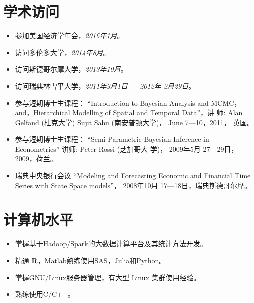 \documentclass[twoside,a4paper,11pt]{article}
\begin{document}
\section*{学术访问}

\begin{itemize}
\item 参加美国经济学年会，\emph{2016年1月}。
\item 访问多伦多大学，\emph{2014年8月}。
\item 访问斯德哥尔摩大学，\emph{2013年10月}。

\item 访问瑞典林雪平大学，\emph{2011年9月1日 --- 2012年 2月29日}。

\item 参与短期博士生课程： ``Introduction to Bayesian Analysis and
  MCMC， and，Hierarchical Modelling of Spatial and Temporal Data''，讲
  师: Alan Gelfand (杜克大学) Sujit Sahu (南安普顿大学)， June
  7---10，2011， 英国。

\item 参与短期博士生课程： ``Semi-Parametric Bayesian Inference in
  Econometrics'' 讲师: Peter Rossi (芝加哥大
  学)， 2009年5月 27---29日，2009，荷兰。

\item 瑞典中央银行会议 ``Modeling and Forecasting Economic and
  Financial Time Series with State Space
  models''， 2008年10月 17---18日，瑞典斯德哥尔摩。
\end{itemize}

\section*{计算机水平}
\begin{itemize}

\item 掌握基于Hadoop/Spark的大数据计算平台及其统计方法开发。

\item  精通 \textbf{R}，Matlab熟练使用SAS，Julia和Python。

\item  掌握GNU/Linux服务器管理，有大型 Linux 集群使用经验。

\item  熟练使用C/C++。
\end{itemize}
\end{document}
